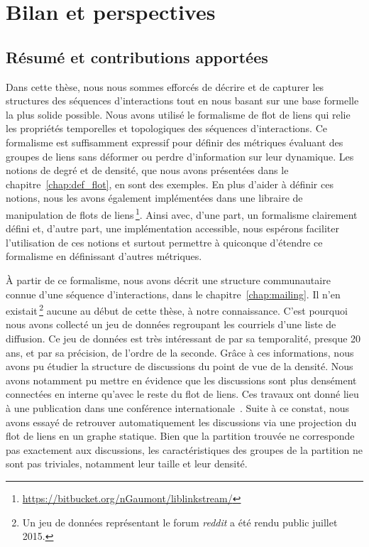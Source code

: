 \chapter{Bilan et perspectives}
\label{Conclusion}

\section{Résumé et contributions apportées}

Dans cette thèse, nous nous sommes efforcés de décrire et de capturer les structures des séquences d'interactions tout en nous basant sur une base formelle la plus solide possible.
Nous avons utilisé le formalisme de flot de liens qui relie les propriétés temporelles et topologiques des séquences d'interactions.
Ce formalisme est suffisamment expressif pour définir des métriques évaluant des groupes de liens sans déformer ou perdre d'information sur leur dynamique.
Les notions de degré et de densité, que nous avons présentées dans le chapitre~\ref{chap:def_flot}, en sont des exemples.
En plus d'aider à définir ces notions, nous les avons également implémentées dans une libraire de manipulation de flots de liens\,\footnote{\url{https://bitbucket.org/nGaumont/liblinkstream/}}.
Ainsi avec, d'une part, un formalisme clairement défini et, d'autre part, une implémentation accessible, nous espérons faciliter l'utilisation de ces notions et surtout permettre à quiconque d'étendre ce formalisme en définissant d'autres métriques.

\`A partir de ce formalisme, nous avons décrit une structure communautaire connue d'une séquence d'interactions, dans le chapitre~\ref{chap:mailing}.
Il n'en existait\,\footnote{Un jeu de données représentant le forum \emph{reddit} a été rendu public juillet 2015.} aucune au début de cette thèse, à notre connaissance.
C'est pourquoi nous avons collecté un jeu de données regroupant les courriels d'une liste de diffusion.
Ce jeu de données est très intéressant de par sa temporalité, presque 20 ans, et par sa précision, de l'ordre de la seconde.
Grâce à ces informations, nous avons pu étudier la structure de discussions du point de vue de la densité.
Nous avons notamment pu mettre en évidence que les discussions sont plus densément connectées en interne qu'avec le reste du flot de liens.
Ces travaux ont donné lieu à une publication dans une conférence internationale~\cite{Gaumont2016}.
Suite à ce constat, nous avons essayé de retrouver automatiquement les discussions via une projection du flot de liens en un graphe statique.
Bien que la partition trouvée ne corresponde pas exactement aux discussions, les caractéristiques des groupes de la partition ne sont pas triviales, notamment leur taille et leur densité.


